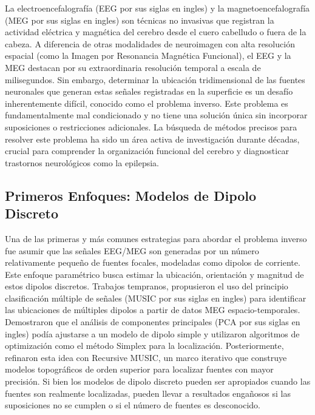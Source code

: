 

La electroencefalografía (EEG por sus siglas en ingles) y la magnetoencefalografía (MEG por sus siglas en ingles) son técnicas no invasivas que registran la actividad eléctrica y magnética del cerebro desde el cuero cabelludo o fuera de la cabeza\cite{Asadzadeh2020}. A diferencia de otras modalidades de neuroimagen con alta resolución espacial (como la Imagen por Resonancia Magnética Funcional), el EEG y la MEG destacan por su extraordinaria resolución temporal a escala de milisegundos. Sin embargo, determinar la ubicación tridimensional de las fuentes neuronales que generan estas señales registradas en la superficie es un desafío inherentemente difícil, conocido como el problema inverso\cite{Hamalainen1994}. Este problema es fundamentalmente mal condicionado y no tiene una solución única sin incorporar suposiciones o restricciones adicionales. La búsqueda de métodos precisos para resolver este problema ha sido un área activa de investigación durante décadas, crucial para comprender la organización funcional del cerebro y diagnosticar trastornos neurológicos como la epilepsia.

\subsection{Primeros Enfoques: Modelos de Dipolo Discreto}

Una de las primeras y más comunes estrategias para abordar el problema inverso fue asumir que las señales EEG/MEG son generadas por un número relativamente pequeño de fuentes focales, modeladas como dipolos de corriente. Este enfoque paramétrico busca estimar la ubicación, orientación y magnitud de estos dipolos discretos. Trabajos tempranos, propusieron el uso del principio clasificación múltiple de señales (MUSIC por sus siglas en ingles)\cite{Mosher1992} para identificar las ubicaciones de múltiples dipolos a partir de datos MEG espacio-temporales. Demostraron que el análisis de componentes principales (PCA por sus siglas en ingles) podía ajustarse a un modelo de dipolo simple y utilizaron algoritmos de optimización como el método Simplex para la localización. Posteriormente, refinaron esta idea con Recursive MUSIC\cite{Mosher1998RecursiveMUSIC}, un marco iterativo que construye modelos topográficos de orden superior para localizar fuentes con mayor precisión. Si bien los modelos de dipolo discreto pueden ser apropiados cuando las fuentes son realmente localizadas, pueden llevar a resultados engañosos si las suposiciones no se cumplen o si el número de fuentes es desconocido.

